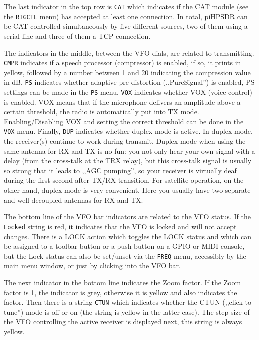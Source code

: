 \documentclass[12pt]{book}
\def\rett#1{\texttt{\color{red}#1}}
\def\bltt#1{\texttt{\color{blue}#1}}
\begin{document}
The last indicator in the top row  is \rett{CAT} which indicates
if the CAT module  (see the \bltt{RIGCTL}  menu) has accepted at least
one connection. In total, piHPSDR can be CAT-controlled simultaneously
by five different sources, two of them using a serial line and
three of them a TCP connection.

The indicators in the middle, between the VFO dials, are related to
transmitting. \rett{CMPR} indicates if a speech processor
(compressor) is enabled, if so, it prints in yellow, followed
by a number between 1 and 20 indicating the compression value in dB.
\rett{PS} indicates whether adaptive pre-distortion (,,PureSignal'')
is enabled, PS settings can be made in the \bltt{PS} menu.
 \rett{VOX} indicates whether VOX (voice control) is enabled. VOX means
 that if  the microphone delivers an amplitude above a certain threshold,
 the radio is automatically put into TX mode. Enabling/Disabling VOX
 and setting the correct threshold can be done in the \bltt{VOX} menu.
 Finally, \rett{DUP} indicates whether duplex mode is active.
 In duplex mode, the receiver(s) continue to work during transmit. Duplex
 mode when using the same antenna for RX and TX is  no fun: you not only hear
 your own signal with a delay (from the cross-talk at the TRX relay), but
 this cross-talk signal is  usually so strong that it leads to ,,AGC pumping'', so
 your receiver is virtually deaf during the first second after TX/RX
 transition. For satellite operation, on the other hand, duplex  mode
 is very convenient. Here you usually have two separate and well-decoupled
 antennas for RX and TX.

 The bottom line of the VFO bar  indicators are related to the VFO status.
 If the \rett{Locked} string is red, it indicates that the VFO is locked
 and will not accept changes. There is a LOCK action which toggles the
 LOCK status and which can be assigned to a toolbar button or a push-button
 on a GPIO or MIDI console, but the Lock status can also be set/unset
 via the \bltt{FREQ} menu, accessibly by the main menu window, or just by
 clicking into the VFO bar.

The next indicator in the bottom  line indicates the Zoom factor. If the
Zoom factor is 1, the indicator is grey, otherwise it is yellow and
also indicates the factor. Then there is a string \rett{CTUN} which
indicates whether the CTUN (,,click to tune'') mode is off or on (the string
is yellow in the latter case). The step size of the VFO controlling the
active receiver is displayed next, this string is always yellow.
\end{document}
